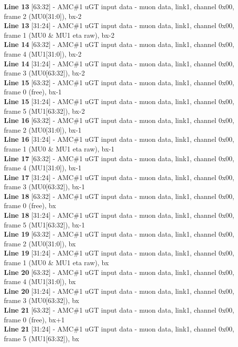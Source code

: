 \textbf{Line 13} [63:32] - AMC\#1 uGT input data - muon data, link1, channel 0x00, frame 2 (MU0[31:0]), bx-2\\
\textbf{Line 13} [31:24] - AMC\#1 uGT input data - muon data, link1, channel 0x00, frame 1 (MU0 \& MU1 eta raw), bx-2\\
\textbf{Line 14} [63:32] - AMC\#1 uGT input data - muon data, link1, channel 0x00, frame 4 (MU1[31:0]), bx-2\\
\textbf{Line 14} [31:24] - AMC\#1 uGT input data - muon data, link1, channel 0x00, frame 3 (MU0[63:32]), bx-2\\
\textbf{Line 15} [63:32] - AMC\#1 uGT input data - muon data, link1, channel 0x00, frame 0 (free), bx-1\\
\textbf{Line 15} [31:24] - AMC\#1 uGT input data - muon data, link1, channel 0x00, frame 5 (MU1[63:32]), bx-2\\
\textbf{Line 16} [63:32] - AMC\#1 uGT input data - muon data, link1, channel 0x00, frame 2 (MU0[31:0]), bx-1\\
\textbf{Line 16} [31:24] - AMC\#1 uGT input data - muon data, link1, channel 0x00, frame 1 (MU0 \& MU1 eta raw), bx-1\\
\textbf{Line 17} [63:32] - AMC\#1 uGT input data - muon data, link1, channel 0x00, frame 4 (MU1[31:0]), bx-1\\
\textbf{Line 17} [31:24] - AMC\#1 uGT input data - muon data, link1, channel 0x00, frame 3 (MU0[63:32]), bx-1\\
\textbf{Line 18} [63:32] - AMC\#1 uGT input data - muon data, link1, channel 0x00, frame 0 (free), bx\\
\textbf{Line 18} [31:24] - AMC\#1 uGT input data - muon data, link1, channel 0x00, frame 5 (MU1[63:32]), bx-1\\
\textbf{Line 19} [63:32] - AMC\#1 uGT input data - muon data, link1, channel 0x00, frame 2 (MU0[31:0]), bx\\
\textbf{Line 19} [31:24] - AMC\#1 uGT input data - muon data, link1, channel 0x00, frame 1 (MU0 \& MU1 eta raw), bx\\
\textbf{Line 20} [63:32] - AMC\#1 uGT input data - muon data, link1, channel 0x00, frame 4 (MU1[31:0]), bx\\
\textbf{Line 20} [31:24] - AMC\#1 uGT input data - muon data, link1, channel 0x00, frame 3 (MU0[63:32]), bx\\
\textbf{Line 21} [63:32] - AMC\#1 uGT input data - muon data, link1, channel 0x00, frame 0 (free), bx+1\\
\textbf{Line 21} [31:24] - AMC\#1 uGT input data - muon data, link1, channel 0x00, frame 5 (MU1[63:32]), bx\\
